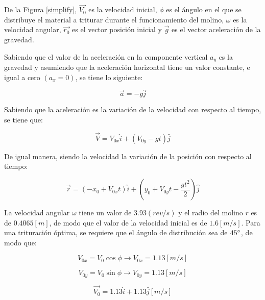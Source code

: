 De la Figura \ref{simplify}, $\vec{V_0}$ es la velocidad inicial, $\phi$ es el \'angulo en el que se distribuye el material a triturar durante el funcionamiento del molino, $\omega$ es la velocidad angular, $\vec{r_0}$ es el vector posici\'on inicial y $\vec{g}$ es el vector aceleraci\'on de la gravedad.

\noindent
\justify

Sabiendo que el valor de la aceleraci\'on en la componente vertical $a_y$ es la gravedad y asumiendo que la aceleraci\'on horizontal tiene un valor constante, e igual a cero $\left( a_x = 0 \right)$, se tiene lo siguiente:

\begin{equation}
\vec{a} = -g \hat{j}
\end{equation}

\noindent
\justify

Sabiendo que la aceleraci\'on es la variaci\'on de la velocidad con respecto al tiempo, se tiene que:

\begin{equation}
\vec{V} = V_{0x} \hat{i} + \left(V_{0y} - gt \right) \hat{j}
\end{equation}

\noindent
\justify

De igual manera, siendo la velocidad la variaci\'on de la posici\'on con respecto al tiempo:

\begin{equation}
\vec{r} = \left(-x_0 + V_{0x} t \right) \hat{i} + \left(y_0 + V_{0y}t - \frac{g t^2}{2} \right) \hat{j}
\end{equation}

\noindent
\justify

La velocidad angular $\omega$ tiene un valor de $3.93 \left(rev /s \right)$ y el radio del molino $r$ es de $0.4065 [m]$, de modo que el valor de la velocidad inicial es de $1.6 [m/s]$. Para una trituraci\'on \'optima, se requiere que el \'angulo de distribuci\'on sea de $45 \degree$, de modo que:

\begin{equation*}
V_{0x} = V_0 \cos \phi \rightarrow V_{0x} = 1.13 [m/s]
\end{equation*}

\begin{equation*}
V_{0y} = V_0 \sin \phi \rightarrow V_{0y} = 1.13 [m/s]
\end{equation*}

\begin{equation}
\vec{V_0} = 1.13 \hat{i} + 1.13 \hat{j} [m/s]
\label{velocidad}
\end{equation}

